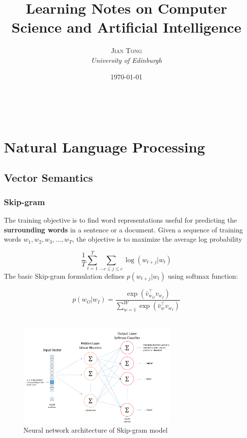 \documentclass[a4paper, 12pt]{book} %
\title{\textbf{Learning Notes on Computer Science and Artificial Intelligence}\\ %
} %
\author{\textsc{Jian Tong} %
\\{\textit{University of Edinburgh}}} %
\date{\today} %
\makeatletter
\renewcommand{\maketitle}{ %
\begin{flushright} %
{\LARGE\@title} %

\vspace{50pt} %

{\large\@author} %
\\\@date %

\vspace{40pt} %
\end{flushright}
}
\makeatother
\begin{document}
\maketitle %

\vspace{30pt} %

\part{Natural Language Processing}


\chapter{Vector Semantics}
\section{Skip-gram}
The training objective is to find word representations useful for predicting the \textbf{surrounding words} in a sentence or a document. Given a sequence of training words $w_1,w_2,w_3,...,w_T$, the objective is to maximize the average log probability

$$\frac{1}{T}\sum_{t=1}^{T}{\sum_{-c\le{j\le{c}}}{\log(w_{t+j}|w_t)}}$$
The basic Skip-gram formulation defines $p(w_{t+j}|w_t)$ using softmax function:

$$p(w_O|w_I)=\frac{\exp{(\bar{v}_{w_{O}}^{\top}v_{w_{I}})}}{\sum_{w=1}^{W}{\exp{(\bar{v}_{w}^{\top}v_{w_{I}})}}}$$ \\

\begin{figure}[htpb]
	\centering
	\includegraphics[width=8cm]{figures/skip_gram_architecture.png}
	\caption{Neural network architecture of Skip-gram model}
	\label{fig:boat1}
\end{figure}
\end{document}
